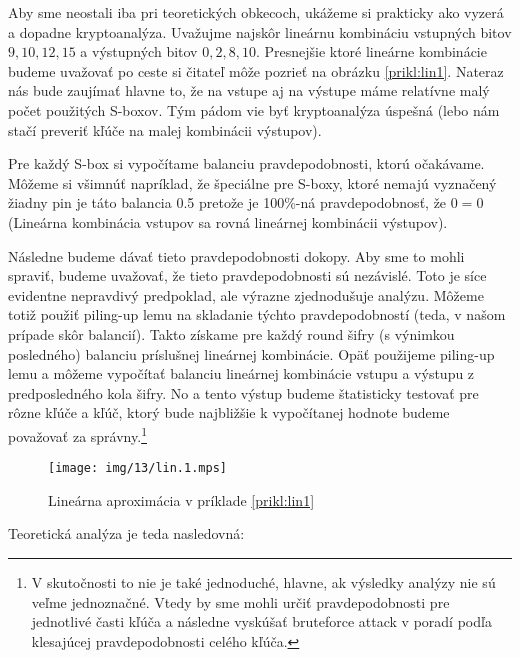 \begin{priklad}
    \label{prikl:lin1}

    Aby sme neostali iba pri teoretických obkecoch, ukážeme si
    prakticky ako vyzerá a dopadne kryptoanalýza. Uvažujme najskôr
    lineárnu kombináciu vstupných bitov $9,10,12,15$ a výstupných
    bitov $0,2,8,10$. Presnejšie ktoré lineárne kombinácie budeme
    uvažovať po ceste si čitateľ môže pozrieť na obrázku
    \ref{prikl:lin1}. Nateraz nás bude zaujímať hlavne to, že na
    vstupe aj na výstupe máme relatívne malý počet použitých S-boxov.
    Tým pádom vie byť kryptoanalýza úspešná (lebo nám stačí preveriť
    kľúče na malej kombinácii výstupov).

    Pre každý S-box si vypočítame balanciu pravdepodobnosti, ktorú
    očakávame. Môžeme si všimnúť napríklad, že špeciálne pre S-boxy,
    ktoré nemajú vyznačený žiadny pin je táto balancia 0.5 pretože je
    100\%-ná pravdepodobnosť, že $0 = 0$ (Lineárna kombinácia vstupov
    sa rovná lineárnej kombinácii výstupov).

    Následne budeme dávať tieto pravdepodobnosti dokopy. Aby sme to
    mohli spraviť, budeme uvažovať, že tieto pravdepodobnosti sú
    nezávislé. Toto je síce evidentne nepravdivý predpoklad, ale
    výrazne zjednodušuje analýzu. Môžeme totiž použiť piling-up lemu
    na skladanie týchto pravdepodobností (teda, v našom prípade skôr
    balancií). Takto získame pre každý round šifry (s výnimkou
    posledného) balanciu príslušnej
    lineárnej kombinácie. Opäť použijeme piling-up lemu a môžeme
    vypočítať balanciu lineárnej kombinácie vstupu a výstupu z
    predposledného kola šifry. No a tento výstup budeme štatisticky
    testovať pre rôzne kľúče a kľúč, ktorý bude najbližšie k
    vypočítanej hodnote budeme považovať za správny.\footnote{V
    skutočnosti to nie je také jednoduché, hlavne, ak výsledky analýzy
    nie sú veľme jednoznačné. Vtedy by sme mohli určiť pravdepodobnosti
    pre jednotlivé časti kľúča a následne vyskúšať bruteforce attack
    v poradí podľa klesajúcej pravdepodobnosti celého kľúča.}

    \begin{figure}[H]
        \centering
        \texttt{[image: img/13/lin.1.mps]}
        \caption{Lineárna aproximácia v príklade \ref{prikl:lin1}}
    \end{figure}


    Teoretická analýza je teda nasledovná:
    


\end{priklad}
